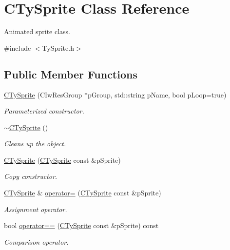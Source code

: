 \hypertarget{class_c_ty_sprite}{
\section{CTySprite Class Reference}
\label{class_c_ty_sprite}
}


Animated sprite class.  




{\ttfamily \#include $<$TySprite.h$>$}

\subsection*{Public Member Functions}
\begin{DoxyCompactItemize}
\item 
\hyperlink{class_c_ty_sprite_ab99453044949be7ea6b910335a801726}{CTySprite} (CIwResGroup $\ast$pGroup, std::string pName, bool pLoop=true)
\begin{DoxyCompactList}\small\item\em Parameterized constructor. \end{DoxyCompactList}\item 
\hyperlink{class_c_ty_sprite_a700ba01fd9611001e814c4fcfeeaf255}{$\sim$CTySprite} ()
\begin{DoxyCompactList}\small\item\em Cleans up the object. \end{DoxyCompactList}\item 
\hyperlink{class_c_ty_sprite_a4ac0e41dc88b9e608dd34dffa5f7ebf9}{CTySprite} (\hyperlink{class_c_ty_sprite}{CTySprite} const \&pSprite)
\begin{DoxyCompactList}\small\item\em Copy constructor. \end{DoxyCompactList}\item 
\hyperlink{class_c_ty_sprite}{CTySprite} \& \hyperlink{class_c_ty_sprite_a59079b5e51e01fbf7b24288d3a630ffb}{operator=} (\hyperlink{class_c_ty_sprite}{CTySprite} const \&pSprite)
\begin{DoxyCompactList}\small\item\em Assignment operator. \end{DoxyCompactList}\item 
bool \hyperlink{class_c_ty_sprite_a53b65f437642ac9a209148792d03d4e1}{operator==} (\hyperlink{class_c_ty_sprite}{CTySprite} const \&pSprite) const 
\begin{DoxyCompactList}\small\item\em Comparison operator. \end{DoxyCompactList}\item 

\end{DoxyCompactItemize}
